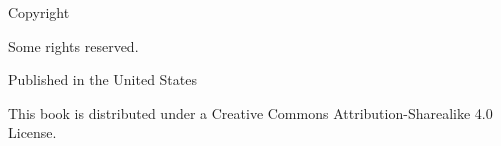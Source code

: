 \pagestyle{empty}

  \begin{center}

  \sffamily

  \makeatletter  \small \thetitle \par \makeatother
  \makeatletter  \small \textit{\thesubtitle} \par \makeatother

    Copyright \ccLogo\ \makeatletter \thedate \ \theauthor \makeatother \par
    Some rights reserved. \par

    \vspace{0.4cm}

    Published in the United States

    \vspace{0.4cm}

    This book is distributed under a Creative Commons Attribution-Sharealike 4.0 License. \par

    \vspace{0.4cm}

    \ccbysa

  \end{center}

